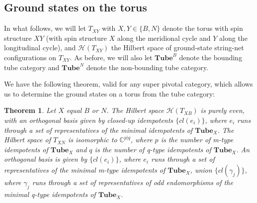 \documentclass[12pt,a4paper]{article}
\newtheorem{theorem}{Theorem}[subsection]
\newcommand{\cc}{\mathbb{C}}
\newcommand{\mch}{\mathcal{H}}
\newcommand{\tube}{\textbf{Tube}}
\begin{document}
\subsection{Ground states on the torus} \label{ground_states_on_torus}

In what follows, we will let $T_{XY}$ with $X,Y\in\{B,N\}$ denote the torus with spin structure $XY$
(with spin structure $X$ along the meridional cycle and $Y$ along the longitudinal cycle),
and $\mch(T_{XY})$ the Hilbert space of ground-state string-net configurations on $T_{XY}$.  
As before, we will also let $\tube^B$ denote the bounding tube category and $\tube^N$ denote the non-bounding tube category. 

We have the following theorem, valid for any super pivotal category, which allows us to determine 
the ground states on a torus from the tube category:

\begin{theorem} \label{torus_basis_theorem}
Let $X$ equal $B$ or $N$.
The Hilbert space $\mch(T_{XB})$ is purely even, with an orthogonal basis given by closed-up idempotents $\{cl(e_i)\}$,
where $e_i$ runs through a set of representatives of the minimal idempotents of $\tube_X$.
The Hilbert space of $T_{XN}$ is isomorphic to $\cc^{p|q}$, where $p$ is the number of m-type idempotents of $\tube_X$
and $q$ is the number of q-type idempotents of $\tube_X$.
An orthogonal basis is given by $\{cl(e_i)\}$, where $e_i$ runs through a set of 
representatives of the minimal m-type idempotents of $\tube_X$,
union $\{cl(\gamma_j)\}$,
where $\gamma_j$ runs through a set of representatives of odd endomorphisms of the minimal q-type idempotents of $\tube_X$.
\end{theorem}
\end{document}
